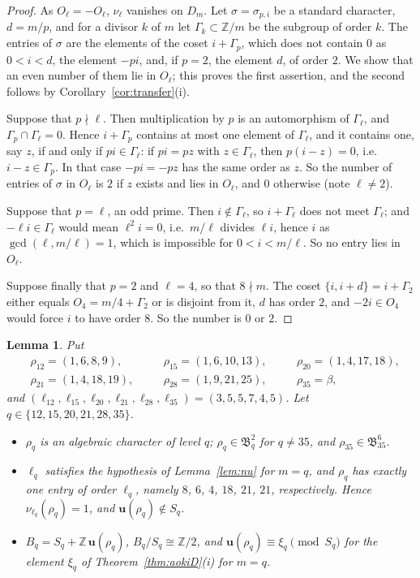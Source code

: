 \documentclass[11pt]{amsart}
\newtheorem{lemma}[theorem]{Lemma}
\theoremstyle{definition}
\theoremstyle{remark}
\numberwithin{equation}{section}
\newcommand{\Z}{\mathbb{Z}}
\newcommand{\fB}{\mathfrak{B}}
\newcommand{\uu}{\mathbf{u}}
\begin{document}
\begin{proof}
As $O_\ell=-O_\ell$, $\nu_\ell$ vanishes on $D_m$. Let $\sigma=\sigma_{p,i}$ be a standard character, $d=m/p$, and for a divisor $k$ of $m$ let $\Gamma_k\subset\Z/m$ be the subgroup of order $k$. The entries of $\sigma$ are the elements of the coset $i+\Gamma_p$, which does not contain $0$ as $0<i<d$, the element $-pi$, and, if $p=2$, the element $d$, of order $2$. We show that an even number of them lie in $O_\ell$; this proves the first assertion, and the second follows by Corollary~\ref{cor:transfer}(i).

Suppose that $p\nmid\ell$. Then multiplication by $p$ is an automorphism of $\Gamma_\ell$, and $\Gamma_p\cap\Gamma_\ell=0$. Hence $i+\Gamma_p$ contains at most one element of $\Gamma_\ell$, and it contains one, say $z$, if and only if $pi\in\Gamma_\ell$: if $pi=pz$ with $z\in\Gamma_\ell$, then $p(i-z)=0$, i.e.\ $i-z\in\Gamma_p$. In that case $-pi=-pz$ has the same order as $z$. So the number of entries of $\sigma$ in $O_\ell$ is $2$ if $z$ exists and lies in $O_\ell$, and $0$ otherwise (note $\ell\ne2$).

Suppose that $p=\ell$, an odd prime. Then $i\notin\Gamma_\ell$, so $i+\Gamma_\ell$ does not meet $\Gamma_\ell$; and $-\ell i\in\Gamma_\ell$ would mean $\ell^2i=0$, i.e.\ $m/\ell$ divides $\ell i$, hence $i$ as $\gcd(\ell,m/\ell)=1$, which is impossible for $0<i<m/\ell$. So no entry lies in $O_\ell$.

Suppose finally that $p=2$ and $\ell=4$, so that $8\nmid m$. The coset $\{i,i+d\}=i+\Gamma_2$ either equals $O_4=m/4+\Gamma_2$ or is disjoint from it, $d$ has order $2$, and $-2i\in O_4$ would force $i$ to have order $8$. So the number is $0$ or $2$.
\end{proof}

\begin{lemma}\label{lem:reps}
Put
\[
\begin{aligned}
&\rho_{12}=(1,6,8,9),&\quad&\rho_{15}=(1,6,10,13),&\quad&\rho_{20}=(1,4,17,18),\\
&\rho_{21}=(1,4,18,19),&&\rho_{28}=(1,9,21,25),&&\rho_{35}=\beta,
\end{aligned}
\]
and $(\ell_{12},\ell_{15},\ell_{20},\ell_{21},\ell_{28},\ell_{35})=(3,5,5,7,4,5)$. Let $q\in\{12,15,20,21,28,35\}$.
\begin{itemize}
\item[(i)] $\rho_q$ is an algebraic character of level $q$; $\rho_q\in\fB^2_q$ for $q\ne35$, and $\rho_{35}\in\fB^6_{35}$.
\item[(ii)] $\ell_q$ satisfies the hypothesis of Lemma~\ref{lem:nu} for $m=q$, and $\rho_q$ has exactly one entry of order $\ell_q$, namely $8$, $6$, $4$, $18$, $21$, $21$, respectively. Hence $\nu_{\ell_q}(\rho_q)=1$, and $\uu(\rho_q)\notin S_q$.
\item[(iii)] $B_q=S_q+\Z\,\uu(\rho_q)$, $B_q/S_q\cong\Z/2$, and $\uu(\rho_q)\equiv\xi_q\pmod{S_q}$ for the element $\xi_q$ of Theorem~\ref{thm:aokiD}(i) for $m=q$.
\end{itemize}
\end{lemma}
\end{document}
